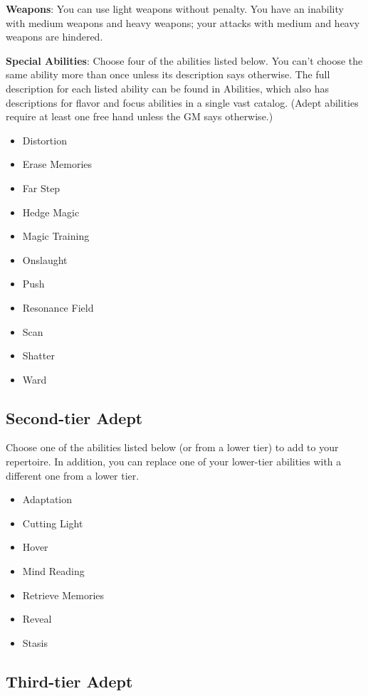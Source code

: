 \begin{multicols}{2}
\textbf{Weapons}: You can use light weapons without penalty. You have an inability with medium weapons and heavy weapons; your attacks with medium and heavy weapons are hindered.

\textbf{Special Abilities}: Choose four of the abilities listed below. You can’t choose the same ability more than once unless its description says otherwise. The full description for each listed ability can be found in Abilities, which also has descriptions for flavor and focus abilities in a single vast catalog. (Adept abilities require at least one free hand unless the GM says otherwise.)

\begin{itemize}
\item Distortion
\item Erase Memories 
\item Far Step
\item Hedge Magic
\item Magic Training
\item Onslaught
\item Push
\item Resonance Field
\item Scan
\item Shatter
\item Ward
\end{itemize}

\subsection{Second-tier Adept}

Choose one of the abilities listed below (or from a lower tier) to add to your repertoire. In addition, you can replace one of your lower-tier abilities with a different one from a lower tier.

\begin{itemize}
\item Adaptation
\item Cutting Light
\item Hover
\item Mind Reading 
\item Retrieve Memories
\item Reveal
\item Stasis
\end{itemize}

\subsection{Third-tier Adept}


\end{multicols}
